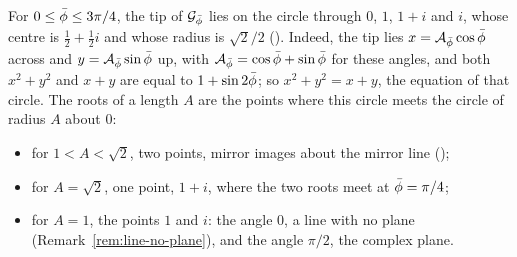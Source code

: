 \begin{remark}\label{rem:tip-circle}
For $0 \le \bar{\phi} \le 3\pi/4$, the tip of $\mathcal{G}_{\bar{\phi}}$ lies on the circle through $0$, $1$, $1 + i$ and $i$, whose centre is $\tfrac{1}{2} + \tfrac{1}{2}i$ and whose radius is $\sqrt{2}/2$ (). Indeed, the tip lies $x = \mathcal{A}_{\bar{\phi}}\cos\bar{\phi}$ across and $y = \mathcal{A}_{\bar{\phi}}\sin\bar{\phi}$ up, with $\mathcal{A}_{\bar{\phi}} = \cos\bar{\phi} + \sin\bar{\phi}$ for these angles, and both $x^2 + y^2$ and $x + y$ are equal to $1 + \sin 2\bar{\phi}$; so $x^2 + y^2 = x + y$, the equation of that circle. The roots of a length $A$ are the points where this circle meets the circle of radius $A$ about $0$:
\begin{itemize}
  \item for $1 < A < \sqrt{2}$, two points, mirror images about the mirror line ();
  \item for $A = \sqrt{2}$, one point, $1 + i$, where the two roots meet at $\bar{\phi} = \pi/4$;
  \item for $A = 1$, the points $1$ and $i$: the angle $0$, a line with no plane (Remark~\ref{rem:line-no-plane}), and the angle $\pi/2$, the complex plane.
\end{itemize}
\end{remark}

